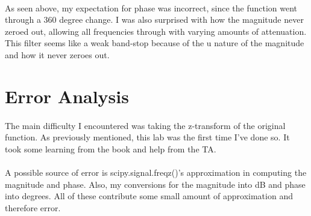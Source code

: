 \documentclass[12pt]{report}
\begin{document}
    \paragraph{} As seen above, my expectation for phase was incorrect, since the function went through a 360 degree change. I was also surprised with how the magnitude never zeroed out, allowing all frequencies through with varying amounts of attenuation. This filter seems like a weak band-stop because of the u nature of the magnitude and how it never zeroes out. 

\section{Error Analysis}


\paragraph{} The main difficulty I encountered was taking the z-transform of the original function. As previously mentioned, this lab was the first time I've done so. It took some learning from the book and help from the TA.

\paragraph{} A possible source of error is scipy.signal.freqz()'s approximation in computing the magnitude and phase. Also, my conversions for the magnitude into dB and phase into degrees. All of these contribute some small amount of approximation and therefore error.
\end{document}
